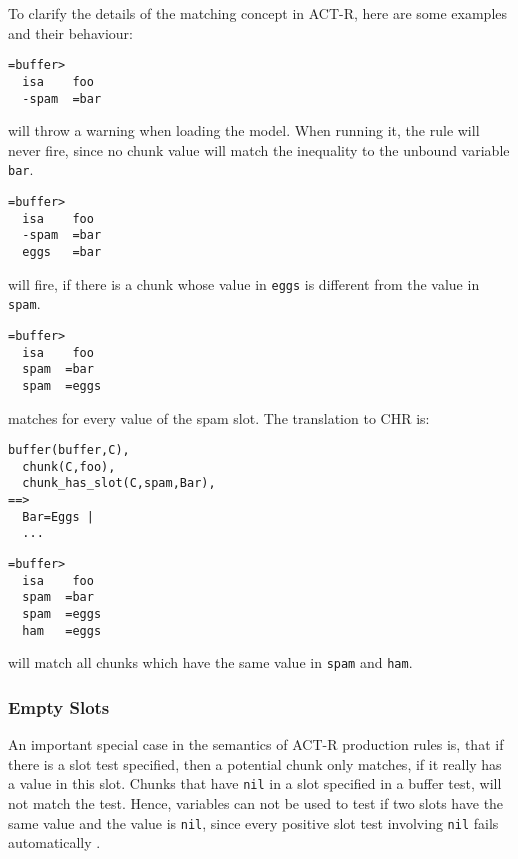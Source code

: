 \begin{example}
To clarify the details of the matching concept in ACT-R, here are some examples and their behaviour:

\begin{lstlisting}
=buffer>
  isa    foo
  -spam  =bar
\end{lstlisting}

will throw a warning when loading the model. When running it, the rule will never fire, since no chunk value will match the inequality to the unbound variable \verb|bar|.

\begin{lstlisting}
=buffer>
  isa    foo
  -spam  =bar
  eggs   =bar
\end{lstlisting}

will fire, if there is a chunk whose value in \verb|eggs| is different from the value in \verb|spam|.

\begin{lstlisting}
=buffer>
  isa    foo
  spam  =bar
  spam  =eggs
\end{lstlisting}

matches for every value of the spam slot. The translation to CHR is:

\begin{lstlisting}
buffer(buffer,C),
  chunk(C,foo),
  chunk_has_slot(C,spam,Bar),
==>
  Bar=Eggs |
  ...
\end{lstlisting}

\begin{lstlisting}
=buffer>
  isa    foo
  spam  =bar
  spam  =eggs
  ham   =eggs
\end{lstlisting}

will match all chunks which have the same value in \verb|spam| and \verb|ham|. 

\end{example}


\subsubsection{Empty Slots}

An important special case in the semantics of ACT-R production rules is, that if there is a slot test specified, then a potential chunk only matches, if it really has a value in this slot. Chunks that have \verb|nil| in a slot specified in a buffer test, will not match the test. Hence, variables can not be used to test if two slots have the same value and the value is \verb|nil|, since every positive slot test involving \verb|nil| fails automatically \cite[p. 164, section ``Variables'', last sentence]{actr_reference}.

